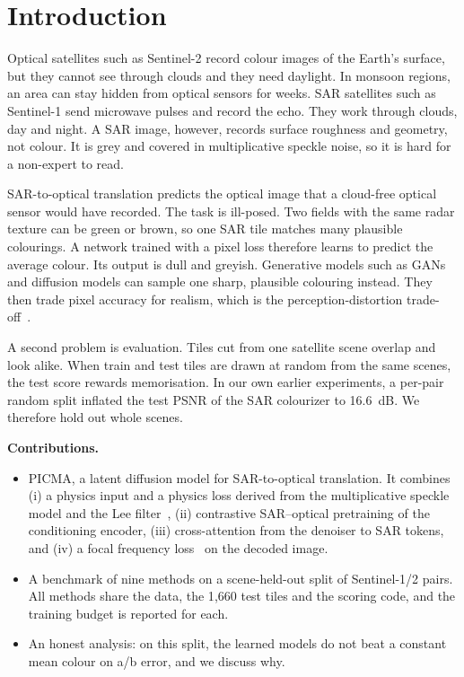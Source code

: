 \documentclass[conference]{IEEEtran}
\begin{document}
\section{Introduction}

Optical satellites such as Sentinel-2 record colour images of the Earth's surface, but they
cannot see through clouds and they need daylight. In monsoon regions, an area can stay
hidden from optical sensors for weeks. SAR satellites such as Sentinel-1 send microwave pulses
and record the echo. They work through clouds, day and night. A SAR image, however, records
surface roughness and geometry, not colour. It is grey and covered in multiplicative speckle
noise, so it is hard for a non-expert to read.

SAR-to-optical translation predicts the optical image that a cloud-free optical sensor would
have recorded. The task is ill-posed. Two fields with the same radar texture can be green or
brown, so one SAR tile matches many plausible colourings. A network trained with a pixel loss
therefore learns to predict the average colour. Its output is dull and greyish.
Generative models such as GANs and diffusion models can sample one sharp, plausible
colouring instead. They then trade pixel accuracy for realism, which is the
perception-distortion trade-off~\cite{blau2018perception}.

A second problem is evaluation. Tiles cut from one satellite scene overlap and look alike.
When train and test tiles are drawn at random from the same scenes, the test score rewards
memorisation. In our own earlier experiments, a per-pair random split inflated
the test PSNR of the SAR colourizer to 16.6~dB. We therefore hold out whole scenes.

\textbf{Contributions.}
\begin{itemize}
\item PICMA, a latent diffusion model for SAR-to-optical translation. It combines (i) a
  physics input and a physics loss derived from the multiplicative speckle model and the
  Lee filter~\cite{lee1980speckle}, (ii) contrastive SAR--optical pretraining of the
  conditioning encoder, (iii) cross-attention from the denoiser to SAR tokens, and (iv) a
  focal frequency loss~\cite{jiang2021ffl} on the decoded image.
\item A benchmark of nine methods on a scene-held-out split of Sentinel-1/2 pairs. All methods
  share the data, the 1{,}660 test tiles and the scoring code, and the training budget is
  reported for each.
\item An honest analysis: on this split, the learned models do not beat a constant mean
  colour on a/b error, and we discuss why.
\end{itemize}
\end{document}
